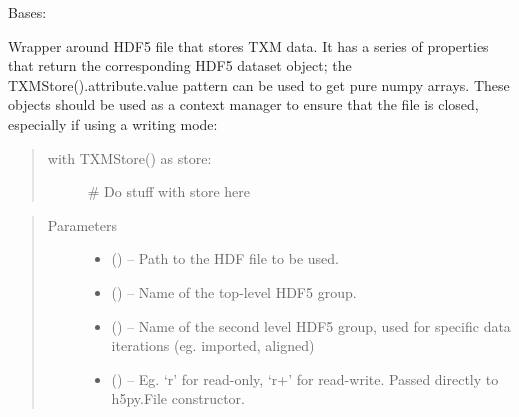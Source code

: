 \documentclass[letterpaper,10pt,english]{sphinxmanual}
\begin{document}
\begin{fulllineitems}
\label{\detokenize{xanespy:xanespy.txmstore.TXMStore}}
Bases: 

Wrapper around HDF5 file that stores TXM data. It has a series of
properties that return the corresponding HDF5 dataset object; the
TXMStore().attribute.value pattern can be used to get pure numpy
arrays. These objects should be used as a context manager to ensure
that the file is closed, especially if using a writing mode:
\begin{quote}
\begin{description}
\item[{with TXMStore() as store:}] \leavevmode
\# Do stuff with store here

\end{description}
\end{quote}
\begin{quote}\begin{description}
\item[{Parameters}] \leavevmode\begin{itemize}
\item {} 
 () -- Path to the HDF file to be used.

\item {} 
 () -- Name of the top-level HDF5 group.

\item {} 
 () -- Name of the second level HDF5 group, used for specific data
iterations (eg. imported, aligned)

\item {} 
 () -- Eg. `r' for read-only, `r+' for read-write. Passed directly to
h5py.File constructor.

\end{itemize}

\end{description}\end{quote}

\begin{fulllineitems}
\label{\detokenize{xanespy:xanespy.txmstore.TXMStore.VERSION}}
\end{fulllineitems}


\end{fulllineitems}
\end{document}
